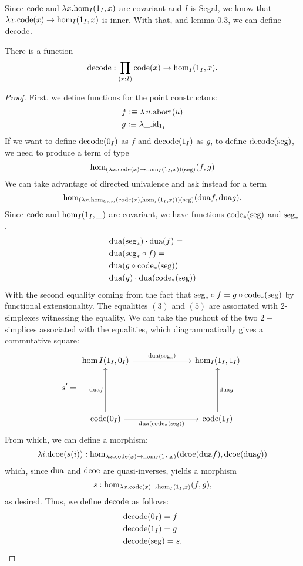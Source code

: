 \documentclass[main.tex]{subfiles}
\begin{document}
Since $\co$ and $\lambda x. \ho[I]{1_I}{x}$ are covariant and $I$ is Segal, we know that $\lambda x. \co(x) \to \ho[I]{1_I}{x}$ is inner. With that, and lemma 0.3, we can define $\dco$.
\begin{lemma}
    There is a function $$\dco : \prod_{(x:I)}\co(x) \to \ho[I]{1_I}{x}.$$
\end{lemma}
\begin{proof}
First, we define functions for the point constructors:
\begin{align*}
    &f \defeq \lambda\, u. \text{abort}(u)\\
    &g \defeq \lambda \_ . \id{1_I}
\end{align*}
If we want to define $\dco(0_I)$ as $f$ and $\dco(1_I)$ as $g$, to define $\dco(\seg)$, we need to produce a term of type $$\ho[(\lambda x . \co(x) \to {\ho[I]{1_I}{x}})(\seg)]{f}{g}$$ We can take advantage of directed univalence and ask instead for a term $$\ho[(\lambda x . {\ho[U_{\text{cov}}]{\co(x)}{\ho[I]{1_I}{x}}})(\seg)]{\dua f}{\dua g}.$$
Since $\co$ and $\ho[I]{1_I}{\_}$ are covariant, we have functions $\co_*(\seg)$ and $\seg_*$. 
\begin{align}
    &\dua(\seg_*)\cdot \dua(f) = \\
    &\dua(\seg_* \circ f) = \\
    &\dua(g \circ \co_*(\seg)) = \\
    &\dua(g) \cdot \dua(\co_*(\seg))
\end{align}
With the second equality coming from the fact that $\seg_* \circ f = g \circ \co_*(\seg)$ by functional extensionality. The equalities $(3)$ and $(5)$ are associated with $2$-simplexes witnessing the equality. We can take the pushout of the two $2-$simplices associated with the equalities, which diagrammatically gives a commutative square:
\[s'= \begin{tikzcd}
	{\hom{I}(1_I,0_I)} &&& {\hom_I(1_I,1_I)} \\
	\\
	\\
	{\text{code}(0_I)} &&& {\text{code}(1_I)}
	\arrow["{\dua{(\seg_*)}}", from=1-1, to=1-4]
	\arrow["{\dua f}", from=4-1, to=1-1]
	\arrow["{\dua(\co_*(\seg))}"', from=4-1, to=4-4]
	\arrow["{\dua g}"', from=4-4, to=1-4]
\end{tikzcd}\]
From which, we can define a morphism:
$$\lambda i. \dcoe(s(i)) : \ho[\lambda x . \co(x) \to {\ho[I]{1_I}{x}}]{\dcoe{(\dua f)}}{\dcoe{(\dua{g}})}$$
which, since $\dua$ and $\dcoe$ are quasi-inverses, yields a morphism $$s : \ho[\lambda x . \co(x) \to {\ho[I]{1_I}{x}}]{f}{g},$$ as desired. Thus, we define $\dco$ as follows:
\begin{align*}
    &\dco(0_I) = f\\
    &\dco(1_I) = g\\
    &\dco(\seg) = s.
\end{align*}
\end{proof}
\end{document}
